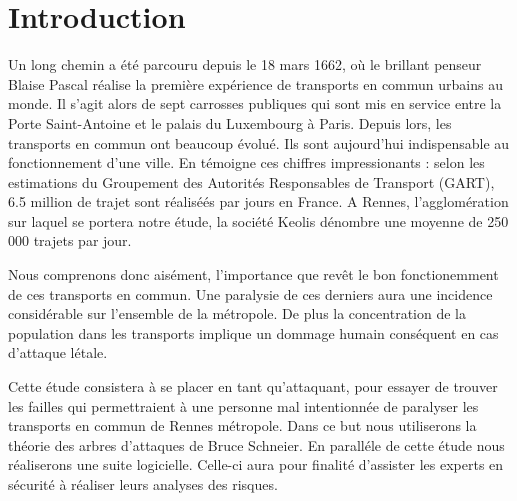 \section{Introduction}
	Un long chemin a été parcouru depuis le 18 mars 1662, où le brillant penseur Blaise Pascal réalise la première expérience de transports en commun urbains au monde. Il s'agit alors de sept carrosses publiques qui sont mis en service entre la Porte Saint-Antoine et le palais du Luxembourg à Paris. Depuis lors, les transports en commun ont beaucoup évolué. Ils sont aujourd'hui indispensable au fonctionnement d'une ville. En témoigne ces chiffres impressionants : selon les estimations du Groupement des Autorités Responsables de Transport (GART), 6.5 million de trajet sont réaliséés par jours en France. A Rennes, l'agglomération sur laquel se portera notre étude, la société Keolis dénombre une moyenne de 250 000 trajets par jour. 

	Nous comprenons donc aisément, l'importance que revêt le bon fonctionemment de ces transports en commun. Une paralysie de ces derniers aura une incidence considérable sur l'ensemble de la métropole. 	De plus la concentration de la population dans les transports implique un dommage humain conséquent en cas d'attaque létale.

	Cette étude consistera à se placer en tant qu'attaquant, pour essayer de trouver les failles qui permettraient à une personne mal intentionnée de paralyser les transports en commun de Rennes métropole. Dans ce but nous utiliserons la théorie des arbres d'attaques de Bruce Schneier. En paralléle de cette étude nous réaliserons une suite logicielle. Celle-ci aura pour finalité d'assister les experts en sécurité à réaliser leurs analyses des risques.

